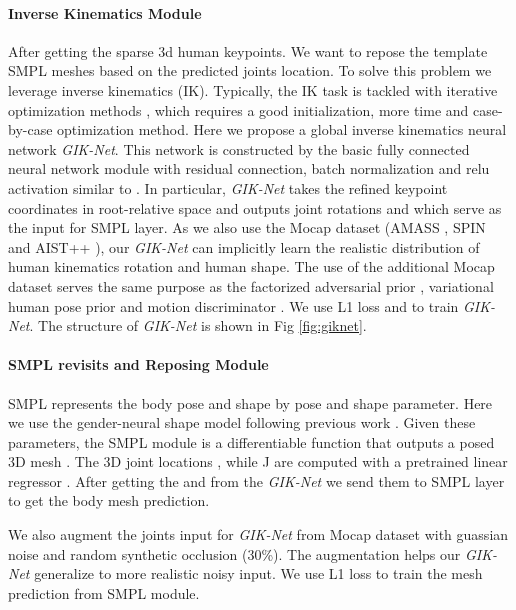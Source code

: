\documentclass[10pt,twocolumn,letterpaper]{article}
\begin{document}
\paragraph{Inverse Kinematics Module} After getting the sparse 3d human keypoints. We want to repose the template SMPL meshes based on the predicted joints location. To solve this problem we leverage inverse kinematics (IK).  Typically, the IK task is tackled with iterative optimization methods \cite{ik1,ik2,ik3}, which requires a good initialization, more time and case-by-case optimization method. Here we propose a global inverse kinematics neural network  \textit{GIK-Net}. This network is constructed by the basic fully connected neural network module with residual connection, batch normalization and relu activation similar to \cite{simple}. In particular, \textit{GIK-Net} takes the refined keypoint coordinates   in root-relative space and outputs joint rotations  and  which serve as the input for SMPL layer. As we also use the Mocap dataset (AMASS \cite{AMASS:ICCV:2019}, SPIN\cite{spin} and AIST++ \cite{aist++}), our \textit{GIK-Net} can implicitly learn the realistic distribution of human kinematics rotation and human shape. The use of the additional Mocap dataset serves the same purpose as the factorized adversarial prior \cite{HMR}, variational human pose prior \cite{SMPL-X:2019} and motion discriminator \cite{kocabas2019vibe}. We use L1 loss   and  to train \textit{GIK-Net}. The structure of \textit{GIK-Net} is shown in Fig \ref{fig:giknet}.


\paragraph{SMPL revisits and Reposing Module} SMPL \cite{smpl} represents the body pose and shape by pose  and shape  parameter. Here we use the gender-neural shape model following previous work \cite{pare,HMR,spin}. Given these parameters, the SMPL module is a differentiable function that outputs a posed 3D mesh . The 3D joint locations , while J are computed with a pretrained linear regressor .
After getting the  and  from the  \textit{GIK-Net} we send them to SMPL layer to get the body mesh prediction.  

We also augment  the joints input for \textit{GIK-Net} from Mocap dataset with guassian noise and random synthetic occlusion (30\%). The augmentation helps our \textit{GIK-Net} generalize to more realistic noisy input.
We use L1 loss   to train the mesh prediction from SMPL module.
\end{document}
